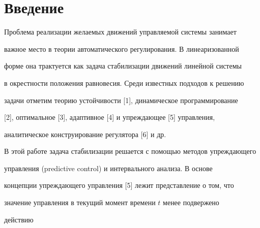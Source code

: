 \date{} 




 


\pagestyle{plain} %


 


 




 


\maketitle 


\label{begin} 


 


\section*{Введение} 


 


Проблема реализации желаемых движений управляемой системы занимает 


важное место в теории автоматического регулирования. В линеаризованной 


форме она трактуется как задача стабилизации движений линейной системы 


в окрестности положения равновесия. Среди известных подходов к решению 


задачи отметим теорию устойчивости [1], динамическое программирование 


[2], оптимальное [3], адаптивное [4] и упреждающее [5] управления, 


аналитическое конструирование регулятора [6] и др. 


 


В этой работе задача стабилизации решается с помощью методов упреждающего 


управления (predictive control) и интервального анализа. В основе 


концепции упреждающего управления [5] лежит представление о том, что 


значение управления в текущий момент времени $t$ менее подвержено 


действию 


